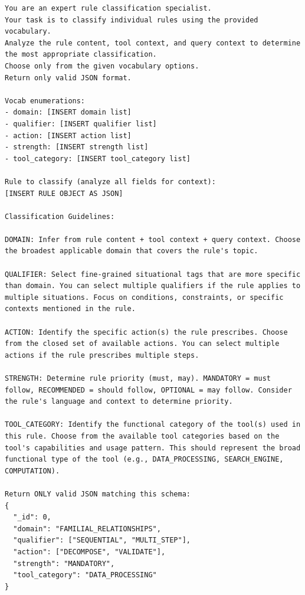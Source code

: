 \documentclass[11pt]{article}
\begin{document}
\begin{lstlisting}[style=promptstyle, caption={Prompt used to classify individual rules using a fixed vocabulary. Vocabulary values and rule content are injected at runtime.}]
You are an expert rule classification specialist.
Your task is to classify individual rules using the provided vocabulary.
Analyze the rule content, tool context, and query context to determine the most appropriate classification.
Choose only from the given vocabulary options.
Return only valid JSON format.

Vocab enumerations:
- domain: [INSERT domain list]
- qualifier: [INSERT qualifier list]
- action: [INSERT action list]
- strength: [INSERT strength list]
- tool_category: [INSERT tool_category list]

Rule to classify (analyze all fields for context):
[INSERT RULE OBJECT AS JSON]

Classification Guidelines:

DOMAIN: Infer from rule content + tool context + query context. Choose the broadest applicable domain that covers the rule's topic.

QUALIFIER: Select fine-grained situational tags that are more specific than domain. You can select multiple qualifiers if the rule applies to multiple situations. Focus on conditions, constraints, or specific contexts mentioned in the rule.

ACTION: Identify the specific action(s) the rule prescribes. Choose from the closed set of available actions. You can select multiple actions if the rule prescribes multiple steps.

STRENGTH: Determine rule priority (must, may). MANDATORY = must follow, RECOMMENDED = should follow, OPTIONAL = may follow. Consider the rule's language and context to determine priority.

TOOL_CATEGORY: Identify the functional category of the tool(s) used in this rule. Choose from the available tool categories based on the tool's capabilities and usage pattern. This should represent the broad functional type of the tool (e.g., DATA_PROCESSING, SEARCH_ENGINE, COMPUTATION).

Return ONLY valid JSON matching this schema:
{
  "_id": 0,
  "domain": "FAMILIAL_RELATIONSHIPS",
  "qualifier": ["SEQUENTIAL", "MULTI_STEP"],
  "action": ["DECOMPOSE", "VALIDATE"],
  "strength": "MANDATORY",
  "tool_category": "DATA_PROCESSING"
}
\end{lstlisting}

\end{document}

